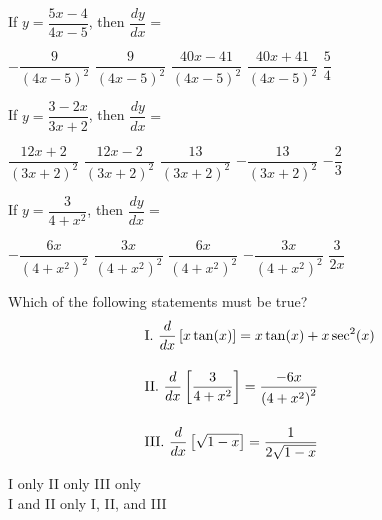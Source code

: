 \begin{questions}
    \question If $y = \dfrac{5x - 4}{4x - 5}$, then $\dfrac{dy}{dx} = $ \\

    \begin{oneparchoices}
        \choice $-\dfrac{9}{(4x - 5)^2}$
        \choice $\dfrac{9}{(4x - 5)^2}$ 
        \choice $\dfrac{40x - 41}{(4x - 5)^2}$
        \choice $\dfrac{40x + 41}{(4x - 5)^2}$
        \choice $\dfrac{5}{4}$
    \end{oneparchoices} \par \horizontalline

    \question If $y = \dfrac{3 - 2x}{3x + 2}$, then $\dfrac{dy}{dx} = $ \\

    \begin{oneparchoices}
        \choice $\dfrac{12x + 2}{(3x + 2)^2}$
        \choice $\dfrac{12x - 2}{(3x + 2)^2}$
        \choice $\dfrac{13}{(3x + 2)^2}$
        \choice $-\dfrac{13}{(3x + 2)^2}$
        \choice $-\dfrac{2}{3}$
    \end{oneparchoices} \par \horizontalline

    \question If $y = \dfrac{3}{4 + x^2}$, then $\dfrac{dy}{dx} = $ \\

    \begin{oneparchoices}
        \choice $-\dfrac{6x}{\left(4 + x^2\right)^2}$
        \choice $\dfrac{3x}{\left(4 + x^2\right)^2}$
        \choice $\dfrac{6x}{\left(4 + x^2\right)^2}$
        \choice $-\dfrac{3x}{\left(4 + x^2\right)^2}$
        \choice $\dfrac{3}{2x}$
    \end{oneparchoices} \par \horizontalline

    \question Which of the following statements must be true? \begin{align*}
        & \text{I. } \dfrac{d}{dx} \left[x\tan (x)\right] = x\tan (x) + x\sec^2 (x) \\[11pt]
        & \text{II. } \dfrac{d}{dx} \left[\dfrac{3}{4 + x^2}\right] = \dfrac{-6x}{\left(4 + x^2\right)^2} \\[11pt]
        & \text{III. } \dfrac{d}{dx} \left[\sqrt{1 - x}\right] = \dfrac{1}{2\sqrt{1 - x}}
    \end{align*}

    \begin{oneparchoices}
        \choice I only 
        \choice II only 
        \choice III only \\[11pt]
        \makebox[0.2 \textwidth] \choice I and II only 
        \makebox[0.25 \textwidth] \choice I, II, and III
    \end{oneparchoices} \par \horizontalline
\end{questions}





